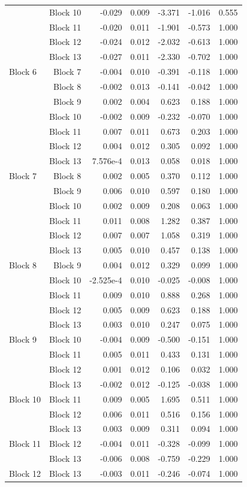 \begin{longtable}{lrrrrrr}
		 & Block 10 & -0.029 & 0.009 & -3.371 & -1.016 & 0.555  \\
		 & Block 11 & -0.020 & 0.011 & -1.901 & -0.573 & 1.000  \\
		 & Block 12 & -0.024 & 0.012 & -2.032 & -0.613 & 1.000  \\
		 & Block 13 & -0.027 & 0.011 & -2.330 & -0.702 & 1.000  \\
		Block 6 & Block 7 & -0.004 & 0.010 & -0.391 & -0.118 & 1.000  \\
		  & Block 8 & -0.002 & 0.013 & -0.141 & -0.042 & 1.000  \\
		 & Block 9 & 0.002 & 0.004 & 0.623 & 0.188 & 1.000  \\
		 & Block 10 & -0.002 & 0.009 & -0.232 & -0.070 & 1.000  \\
		 & Block 11 & 0.007 & 0.011 & 0.673 & 0.203 & 1.000  \\
		 & Block 12 & 0.004 & 0.012 & 0.305 & 0.092 & 1.000  \\
		 & Block 13 & 7.576e-4 & 0.013 & 0.058 & 0.018 & 1.000  \\
		Block 7 & Block 8 & 0.002 & 0.005 & 0.370 & 0.112 & 1.000  \\
		  & Block 9 & 0.006 & 0.010 & 0.597 & 0.180 & 1.000  \\
		 & Block 10 & 0.002 & 0.009 & 0.208 & 0.063 & 1.000  \\
		 & Block 11 & 0.011 & 0.008 & 1.282 & 0.387 & 1.000  \\
		 & Block 12 & 0.007 & 0.007 & 1.058 & 0.319 & 1.000  \\
		 & Block 13 & 0.005 & 0.010 & 0.457 & 0.138 & 1.000  \\
		Block 8 & Block 9 & 0.004 & 0.012 & 0.329 & 0.099 & 1.000  \\
		  & Block 10 & -2.525e-4 & 0.010 & -0.025 & -0.008 & 1.000  \\
		 & Block 11 & 0.009 & 0.010 & 0.888 & 0.268 & 1.000  \\
		 & Block 12 & 0.005 & 0.009 & 0.623 & 0.188 & 1.000  \\
		 & Block 13 & 0.003 & 0.010 & 0.247 & 0.075 & 1.000  \\
		Block 9 & Block 10 & -0.004 & 0.009 & -0.500 & -0.151 & 1.000  \\
		  & Block 11 & 0.005 & 0.011 & 0.433 & 0.131 & 1.000  \\
		 & Block 12 & 0.001 & 0.012 & 0.106 & 0.032 & 1.000  \\
		 & Block 13 & -0.002 & 0.012 & -0.125 & -0.038 & 1.000  \\
		Block 10 & Block 11 & 0.009 & 0.005 & 1.695 & 0.511 & 1.000  \\
		  & Block 12 & 0.006 & 0.011 & 0.516 & 0.156 & 1.000  \\
		 & Block 13 & 0.003 & 0.009 & 0.311 & 0.094 & 1.000  \\
		Block 11 & Block 12 & -0.004 & 0.011 & -0.328 & -0.099 & 1.000  \\
		  & Block 13 & -0.006 & 0.008 & -0.759 & -0.229 & 1.000  \\
		Block 12 & Block 13 & -0.003 & 0.011 & -0.246 & -0.074 & 1.000  \\


\end{longtable}
